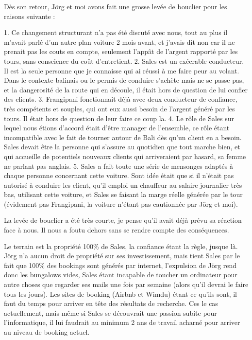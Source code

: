 Dès son retour, Jörg et moi avons fait une grosse levée de bouclier pour les raisons suivante :

1. Ce changement structurant n’a pas été discuté avec nous, tout au plus il m’avait parlé d’un autre plan voiture 2 mois avant, et j’avais dit non car il ne prenait pas les couts en compte, seulement l’appât de l’argent rapporté par les tours, sans conscience du coût d’entretient.
2. Sales est un exécrable conducteur. Il est la seule personne que je connaisse qui ai réussi à me faire peur au volant. Dans le contexte balinais ou le permis de conduire s’achète mais ne se passe pas, et la dangerosité de la route qui en découle, il était hors de question de lui confier des clients.
3. Frangipani fonctionnait déjà avec deux conducteur de confiance, très compétents et souples, qui ont eux aussi besoin de l’argent généré par les tours. Il était hors de question de leur faire ce coup la.
4. Le rôle de Sales sur lequel nous étions d’accord était d’être manager de l’ensemble, ce rôle étant incompatible avec le fait de tourner autour de Bali dès qu’un client en a besoin. Sales devait être la personne qui s’assure au quotidien que tout marche bien, et qui accueille de potentiels nouveaux clients qui arriveraient par hasard, sa femme ne parlant pas anglais.
5. Sales a fait toute une série de mensonges adaptés à chaque personne concernant cette voiture. Sont idée était que si il n’était pas autorisé à conduire les client, qu’il emploi un chauffeur au salaire journalier très bas, utilisant cette voiture, et Sales se faisant la marge réelle générée par le tour (évidement pas Frangipani, la voiture n’étant pas cautionnée par Jörg et moi).

La levée de bouclier a été très courte, je pense qu’il avait déjà prévu sa réaction face à nous. Il nous a foutu dehors sans se rendre compte des conséquences.

Le terrain est la propriété 100\% de Sales, la confiance étant la règle, jusque là. Jörg n’a aucun droit de propriété sur ses investissement, mais tient Sales par le fait que 100\% des bookings sont générés par internet, l’expulsion de Jörg rend donc les bungalows vides, Sales étant incapable de toucher un ordinateur pour autre choses que regarder ses mails une fois par semaine (alors qu’il devrai le faire tous les jours). Les sites de booking (Airbnb et Wimdu) étant ce qu’ils sont, il faut du temps pour arriver en tête des résultats de recherche. Ces le cas actuellement, mais même si Sales se découvrait une passion subite pour l’informatique, il lui faudrait au minimum 2 ans de travail acharné pour arriver au niveau de booking actuel.

